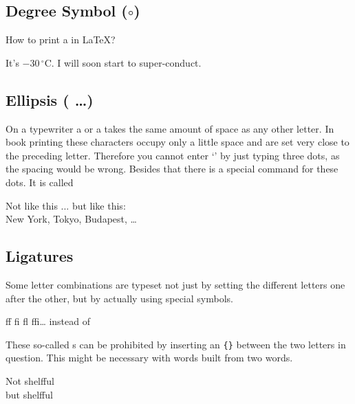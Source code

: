 \subsection{Degree Symbol ($\circ$)}

How to print a  in \LaTeX{}?

\begin{example}
It's $-30\,^{\circ}\mathrm{C}$.
I will soon start to
super-conduct.
\end{example}

\subsection{Ellipsis ( \ldots )}

On a typewriter a  or a  takes the same amount of
space as any other letter. In book printing these characters occupy
only a little space and are set very close to the preceding letter.
Therefore you cannot enter `' by just typing three
dots, as the spacing would be wrong. Besides that there is a special
command for these dots. It is called

\begin{lscommand}
\end{lscommand}


\begin{example}
Not like this ... but like this:\\
New York, Tokyo, Budapest, \ldots
\end{example}
 
\subsection{Ligatures}

Some letter combinations are typeset not just by setting the
different letters one after the other, but by actually using special
symbols.
\begin{code}
{\large ff fi fl ffi\ldots}\quad
instead of
\end{code}
These so-called s can be prohibited by inserting an \verb|{}|
between the two letters in question. This might be necessary with
words built from two words.

\begin{example}
Not shelfful\\
but shelf\mbox{}ful
\end{example}
 
